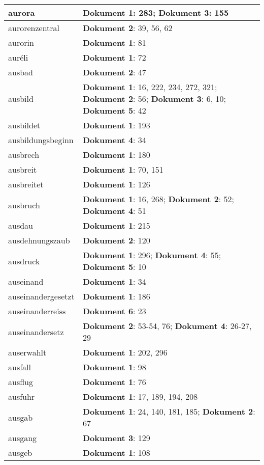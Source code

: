 \documentclass[a5paper]{article}
\begin{document}
\begin{longtable}[l]{|l|p{3in}|}
\hline
aurora & \textbf{Dokument 1}: 283; \textbf{Dokument 3}: 155 \\
\hline
aurorenzentral & \textbf{Dokument 2}: 39, 56, 62 \\
\hline
aurorin & \textbf{Dokument 1}: 81 \\
\hline
auréli & \textbf{Dokument 1}: 72 \\
\hline
ausbad & \textbf{Dokument 2}: 47 \\
\hline
ausbild & \textbf{Dokument 1}: 16, 222, 234, 272, 321; \textbf{Dokument 2}: 56; \textbf{Dokument 3}: 6, 10; \textbf{Dokument 5}: 42 \\
\hline
ausbildet & \textbf{Dokument 1}: 193 \\
\hline
ausbildungsbeginn & \textbf{Dokument 4}: 34 \\
\hline
ausbrech & \textbf{Dokument 1}: 180 \\
\hline
ausbreit & \textbf{Dokument 1}: 70, 151 \\
\hline
ausbreitet & \textbf{Dokument 1}: 126 \\
\hline
ausbruch & \textbf{Dokument 1}: 16, 268; \textbf{Dokument 2}: 52; \textbf{Dokument 4}: 51 \\
\hline
ausdau & \textbf{Dokument 1}: 215 \\
\hline
ausdehnungszaub & \textbf{Dokument 2}: 120 \\
\hline
ausdruck & \textbf{Dokument 1}: 296; \textbf{Dokument 4}: 55; \textbf{Dokument 5}: 10 \\
\hline
auseinand & \textbf{Dokument 1}: 34 \\
\hline
auseinandergesetzt & \textbf{Dokument 1}: 186 \\
\hline
auseinanderreiss & \textbf{Dokument 6}: 23 \\
\hline
auseinandersetz & \textbf{Dokument 2}: 53-54, 76; \textbf{Dokument 4}: 26-27, 29 \\
\hline
auserwahlt & \textbf{Dokument 1}: 202, 296 \\
\hline
ausfall & \textbf{Dokument 1}: 98 \\
\hline
ausflug & \textbf{Dokument 1}: 76 \\
\hline
ausfuhr & \textbf{Dokument 1}: 17, 189, 194, 208 \\
\hline
ausgab & \textbf{Dokument 1}: 24, 140, 181, 185; \textbf{Dokument 2}: 67 \\
\hline
ausgang & \textbf{Dokument 3}: 129 \\
\hline
ausgeb & \textbf{Dokument 1}: 108 \\
\hline

\end{longtable}
\end{document}
